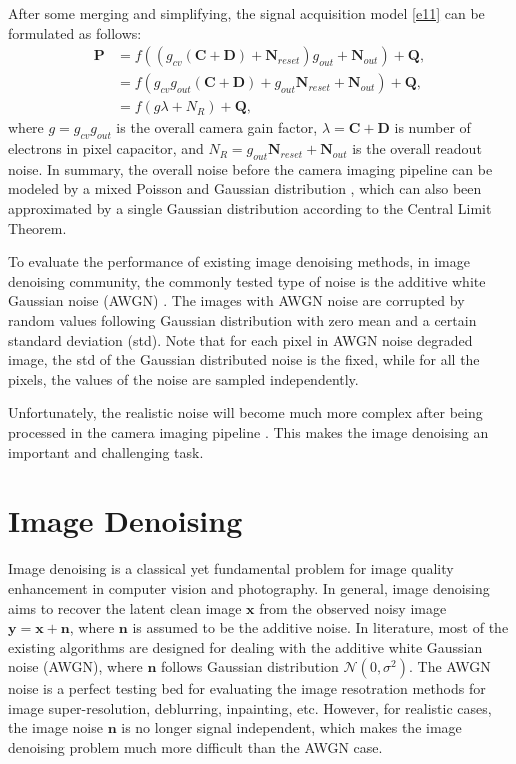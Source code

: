 After some merging and simplifying, the signal acquisition model \ref{e11} can be formulated as follows:
\begin{equation}
\label{e12}
\begin{split}
\textbf{P} 
&=f((g_{cv}(\textbf{C}+\textbf{D})+\textbf{N}_{reset})g_{out}+\textbf{N}_{out})+\textbf{Q},
\\
&=f(g_{cv}g_{out}(\textbf{C}+\textbf{D})+g_{out}\textbf{N}_{reset}+\textbf{N}_{out})+\textbf{Q},
\\
&=f(g\lambda+N_{R})+\textbf{Q},
\end{split}
\end{equation}
where $g = g_{cv}g_{out}$ is the overall camera gain factor, $\lambda=\textbf{C}+\textbf{D}$ is number of electrons in pixel capacitor, and $N_{R}=g_{out}\textbf{N}_{reset}+\textbf{N}_{out}$ is the overall readout noise. In summary, the overall noise before the camera imaging pipeline can be modeled by a mixed Poisson and Gaussian distribution \cite{Foipractical}, which can also been approximated by a single Gaussian distribution according to the Central Limit Theorem.

To evaluate the performance of existing image denoising methods, in image denoising community, the commonly tested type of noise is the additive white Gaussian noise (AWGN) \cite{bm3d,ksvd}. The images with AWGN noise are corrupted by random values following Gaussian distribution with zero mean and a certain standard deviation (std). Note that for each pixel in AWGN noise degraded image, the std of the Gaussian distributed noise is the fixed, while for all the pixels, the values of the noise are sampled independently.

Unfortunately, the realistic noise will become much more complex after being processed in the camera imaging pipeline \cite{crosschannel2016}. This makes the image denoising an important and challenging task. 


\section{Image Denoising}

Image denoising is a classical yet fundamental problem for image quality enhancement in computer vision and photography. In general, image denoising aims to recover the latent clean image $\bm{x}$ from the observed noisy image $\bm{y}=\bm{x}+\bm{n}$, where $\bm{n}$ is assumed to be the additive noise. In literature, most of the existing algorithms are designed for dealing with the additive white Gaussian noise (AWGN), where $\bm{n}$ follows Gaussian distribution $\mathcal{N}(0,\sigma^{2})$.  The AWGN noise is a perfect testing bed for evaluating the image resotration methods for image super-resolution, deblurring, inpainting, etc. However, for realistic cases, the image noise $\bm{n}$ is no longer signal independent, which makes the image denoising problem much more difficult than the AWGN case.


